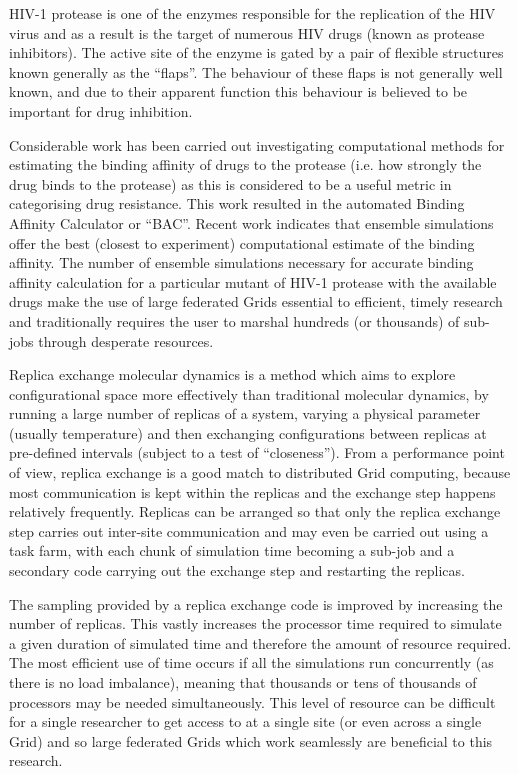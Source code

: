 \documentclass[a4paper,10pt,twocolumn]{article}
\begin{document}

HIV-1 protease is one of the enzymes responsible for the replication of the HIV virus and as a result is the target of numerous HIV drugs (known as protease inhibitors).  The active site of the enzyme is gated by a pair of flexible structures known generally as the ``flaps''.  The behaviour of these flaps is not generally well known, and due to their apparent function this behaviour is believed to be important for drug inhibition.  

Considerable work has been carried out\cite{ref:BAC} investigating computational methods for estimating the binding affinity of drugs to the protease (i.e. how strongly the drug binds to the protease) as this is considered to be a useful metric in categorising drug resistance.  This work resulted in the automated Binding Affinity Calculator or ``BAC''\cite{ref:BAC2}. Recent work indicates that ensemble simulations offer the best (closest to experiment) computational estimate of the binding affinity.  The number of ensemble simulations necessary for accurate binding affinity calculation for a particular mutant of HIV-1 protease with the available drugs make the use of large federated Grids essential to efficient, timely research and traditionally requires the user to marshal hundreds (or thousands) of sub-jobs through desperate resources.

Replica exchange molecular dynamics is a method which aims to explore configurational space more effectively than traditional molecular dynamics, by running a large number of replicas of a system, varying a physical parameter (usually temperature) and then exchanging configurations between replicas at pre-defined intervals (subject to a test of ``closeness'').  From a performance point of view, replica exchange is a good match to distributed Grid computing, because most communication is kept within the replicas and the exchange step happens relatively frequently.  Replicas can be arranged so that only the replica exchange step carries out inter-site communication and may even be carried out using a task farm, with each chunk of simulation time becoming a sub-job and a secondary code carrying out the exchange step and restarting the replicas.  

The sampling provided by a replica exchange code is improved by increasing the number of replicas.  This vastly increases the processor time required to simulate a given duration of simulated time and therefore the amount of resource required.  The most efficient use of time occurs if all the simulations run concurrently (as there is no load imbalance), meaning that thousands or tens of thousands of processors may be needed simultaneously.  This level of resource can be difficult for a single researcher to get access to at a single site (or even across a single Grid) and so large federated Grids which work seamlessly are beneficial to this research.  
 
\end{document}
